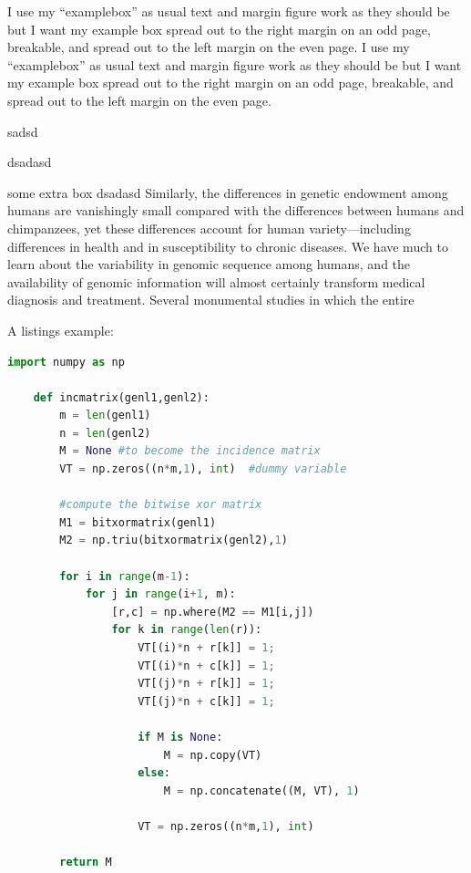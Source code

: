 \documentclass[]{subook}
\begin{document}

\begin{examplebox}{}
    I use my ``examplebox'' as usual text and margin figure work as they should be but I want my example box spread out to the right margin on an odd page, breakable, and spread out to the left margin on the even page.
    \tcblower
    I use my ``examplebox'' as usual text and margin figure work as they should be but I want my example box spread out to the right margin on an odd page, breakable, and spread out to the left margin on the even page.
  \end{examplebox}

\lipsum[2-5]
\begin{corollary}
    sadsd
\end{corollary}
\lipsum[3]
\begin{proposition}[dsaf]
    dsadasd
\end{proposition}

\begin{tbox}{some extra box}
    dsadasd
    Similarly, the differences in genetic endowment among humans are vanishingly small compared with the differences between humans and chimpanzees, yet these differences account for human\citep{li2022limb} variety—including differences in health and in susceptibility to chronic diseases. We have much to learn about the variability in genomic sequence among humans, and the availability of genomic information will almost certainly transform medical diagnosis and treatment. Several monumental studies in which the entire
\end{tbox}


A listings example:
\begin{lstlisting}[language=Python, caption=Python example]
    import numpy as np

    def incmatrix(genl1,genl2):
        m = len(genl1)
        n = len(genl2)
        M = None #to become the incidence matrix
        VT = np.zeros((n*m,1), int)  #dummy variable
        
        #compute the bitwise xor matrix
        M1 = bitxormatrix(genl1)
        M2 = np.triu(bitxormatrix(genl2),1) 
    
        for i in range(m-1):
            for j in range(i+1, m):
                [r,c] = np.where(M2 == M1[i,j])
                for k in range(len(r)):
                    VT[(i)*n + r[k]] = 1;
                    VT[(i)*n + c[k]] = 1;
                    VT[(j)*n + r[k]] = 1;
                    VT[(j)*n + c[k]] = 1;
                    
                    if M is None:
                        M = np.copy(VT)
                    else:
                        M = np.concatenate((M, VT), 1)
                    
                    VT = np.zeros((n*m,1), int)
        
        return M
    \end{lstlisting}

\end{document}
